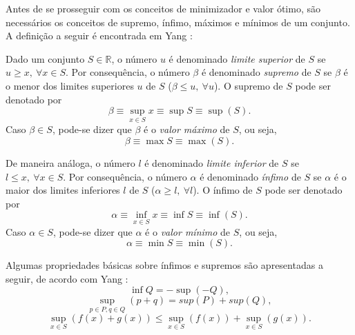 Antes de se prosseguir com os conceitos de minimizador e valor \'{o}timo, s\~{a}o necess\'{a}rios os
conceitos de supremo, \'{i}nfimo, m\'{a}ximos e m\'{i}nimos de um conjunto. A defini\c{c}\~{a}o a seguir \'{e} encontrada em Yang \cite{yang}:
\begin{definition} \label{defSupInf}
Dado um conjunto $S \in \mathbb{R}$, o n\'{u}mero $u$ \'{e} denominado \textit{limite superior} de $S$ se $u \ge x, ~ \forall x \in S$. Por consequ\^{e}ncia, o n\'{u}mero $\beta$ \'{e} denominado \textit{supremo} de $S$ se $\beta$ \'{e} o menor dos limites superiores $u$ de $S$ ($\beta \le u ,~\forall u$). O supremo de $S$ pode ser denotado por
\begin{equation}
\beta \equiv \sup_{x \in S} x \equiv \sup S \equiv \sup(S).
\end{equation}
Caso $\beta \in S$, pode-se dizer que $\beta$ \'{e} o \textit{valor m\'{a}ximo} de $S$, ou seja,
\begin{equation}
\beta \equiv \max S \equiv \max(S).
\end{equation}

De maneira an\'{a}loga, o n\'{u}mero $l$ \'{e} denominado \textit{limite inferior} de $S$ se $l \le x, ~ \forall x \in S$. Por consequ\^{e}ncia, o n\'{u}mero $\alpha$ \'{e} denominado \textit{\'{i}nfimo} de $S$ se $\alpha$ \'{e} o maior dos limites inferiores $l$ de $S$ ($\alpha \ge l ,~\forall l$). O \'{i}nfimo de $S$ pode ser denotado por
\begin{equation}
\alpha \equiv \inf_{x \in S} x \equiv \inf S \equiv \inf(S).
\end{equation}
Caso $\alpha \in S$, pode-se dizer que $\alpha$ \'{e} o \textit{valor m\'{i}nimo} de $S$, ou seja,
\begin{equation}
\alpha \equiv \min S \equiv \min(S).
\end{equation}
\end{definition} 

Algumas propriedades b\'{a}sicas sobre \'{i}nfimos e supremos s\~{a}o apresentadas a seguir, de acordo com Yang \cite{yang}:
\begin{equation}
\inf Q = -\sup(-Q),
\end{equation}
\begin{equation}
\sup_{p \in P, q \in Q} (p+q) = sup(P) + sup(Q),
\end{equation}
\begin{equation}
\sup_{x \in S}\left(f(x)+g(x)\right) \le \sup_{x \in S}\left(f(x)\right) + \sup_{x \in S}\left(g(x)\right).
\end{equation}

